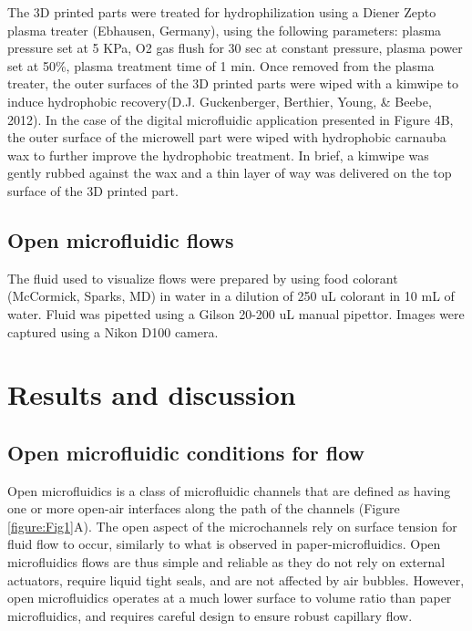The 3D printed parts were treated for hydrophilization using a Diener Zepto plasma treater (Ebhausen, Germany), using the following parameters: plasma pressure set at 5 KPa, O2 gas flush for 30 sec at constant pressure, plasma power set at 50\%, plasma treatment time of 1 min. Once removed from the plasma treater, the outer surfaces of the 3D printed parts were wiped with a kimwipe to induce hydrophobic recovery(D.J. Guckenberger, Berthier, Young, & Beebe, 2012). In the case of the digital microfluidic application presented in Figure 4B, the outer surface of the microwell part were wiped with hydrophobic carnauba wax to further improve the hydrophobic treatment. In brief, a kimwipe was gently rubbed against the wax and a thin layer of way was delivered on the top surface of the 3D printed part. 

\subsection{Open microfluidic flows}
The fluid used to visualize flows were prepared by using food colorant (McCormick, Sparks, MD) in water in a dilution of 250 uL colorant in 10 mL of water. Fluid was pipetted using a Gilson 20-200 uL manual pipettor. Images were captured using a Nikon D100 camera.

\section{Results and discussion}

\subsection{Open microfluidic conditions for flow}
Open microfluidics is a class of microfluidic channels that are defined as having one or more open-air interfaces along the path of the channels (Figure \ref{figure:Fig1}A). The open aspect of the microchannels rely on surface tension for fluid flow to occur, similarly to what is observed in paper-microfluidics. Open microfluidics flows are thus simple and reliable as they do not rely on external actuators, require liquid tight seals, and are not affected by air bubbles. However, open microfluidics operates at a much lower surface to volume ratio than paper microfluidics, and requires careful design to ensure robust capillary flow. 

